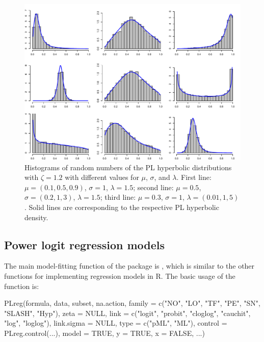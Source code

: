 \begin{figure}[t!]
\centering
\includegraphics[scale=0.5]{figures/Fig1}
\caption{\label{fig:Fig1} Histograms of random numbers of the PL hyperbolic distributions with $\zeta = 1.2$ with different values for $\mu$, $\sigma$, and $\lambda$. First line: $\mu = (0.1, 0.5, 0.9)$, $\sigma=1$, $\lambda=1.5$; second line: $\mu = 0.5$, $\sigma=(0.2, 1, 3)$, $\lambda=1.5$; third line: $\mu = 0.3$, $\sigma=1$, $\lambda=(0.01, 1, 5)$. Solid lines are
corresponding to the respective PL hyperbolic density.}
\end{figure}

\subsection{Power logit regression models}

The main model-fitting function of the  package is , which is similar to the other functions for implementing regression models in R. The basic usage of the  function is:
\begin{Scode}
PLreg(formula, data, subset, na.action, 
 family = c("NO", "LO", "TF", "PE", "SN", "SLASH", "Hyp"), zeta = NULL, 
 link = c("logit", "probit", "cloglog", "cauchit", "log", "loglog"), 
 link.sigma = NULL, type = c("pML", "ML"), control = PLreg.control(...), 
 model = TRUE, y = TRUE, x = FALSE, ...)
\end{Scode}

